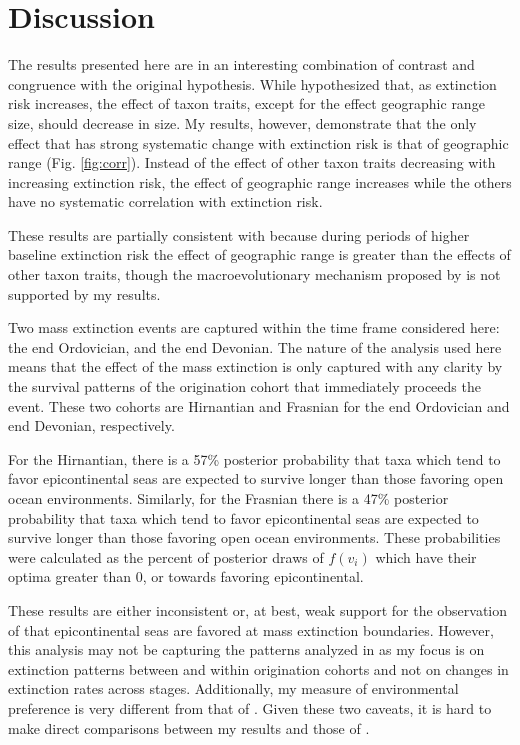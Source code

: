 \documentclass[12pt,letterpaper]{article}
\begin{document}
\section{Discussion}

The results presented here are in an interesting combination of contrast and congruence with the original \citet{Jablonski1987} hypothesis. While \citet{Jablonski1987} hypothesized that, as extinction risk increases, the effect of taxon traits, except for the effect geographic range size, should decrease in size. My results, however, demonstrate that the only effect that has strong systematic change with extinction risk is that of geographic range (Fig. \ref{fig:corr}). Instead of the effect of other taxon traits decreasing with increasing extinction risk, the effect of geographic range increases while the others have no systematic correlation with extinction risk. 

These results are partially consistent with \citet{Jablonski1987} because during periods of higher baseline extinction risk the effect of geographic range is greater than the effects of other taxon traits, though the macroevolutionary mechanism proposed by \citet{Jablonski1987} is not supported by my results.

Two mass extinction events are captured within the time frame considered here: the end Ordovician, and the end Devonian. The nature of the analysis used here means that the effect of the mass extinction is only captured with any clarity by the survival patterns of the origination cohort that immediately proceeds the event. These two cohorts are Hirnantian and Frasnian for the end Ordovician and end Devonian, respectively.

For the Hirnantian, there is a 57\% posterior probability that taxa which tend to favor epicontinental seas are expected to survive longer than those favoring open ocean environments. Similarly, for the Frasnian there is a 47\% posterior probability that taxa which tend to favor epicontinental seas are expected to survive longer than those favoring open ocean environments. These probabilities were calculated as the percent of posterior draws of \(f(v_{i})\) which have their optima greater than 0, or towards favoring epicontinental. 

These results are either inconsistent or, at best, weak support for the observation of \citet{Miller2009a} that epicontinental seas are favored at mass extinction boundaries. However, this analysis may not be capturing the patterns analyzed in \citet{Miller2009a} as my focus is on extinction patterns between and within origination cohorts and not on changes in extinction rates across stages. Additionally, my measure of environmental preference is very different from that of \citet{Miller2009a}. Given these two caveats, it is hard to make direct comparisons between my results and those of \citet{Miller2009a}.
\end{document}
